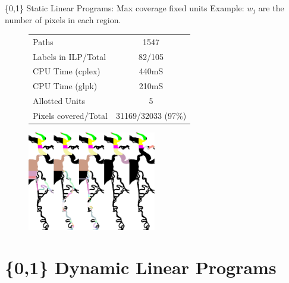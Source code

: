 \documentclass[xcolor=pdflatex,dvipsnames,table]{beamer}
\begin{document}
\begin{frame}{\{0,1\} Static Linear Programs: Max coverage fixed units}
Example: $w_j$ are the number of pixels in each region.
\begin{figure}
  \begin{tabular}{|l|c|}
  \hline 
  Paths & 1547 \\
  Labels in ILP/Total & 82/105 \\
  CPU Time (cplex) & 440mS\\
  CPU Time (glpk) & 210mS \\
  Allotted Units & 5\\
  Pixels covered/Total & 31169/32033 (97\%)\\
  \hline
  \end{tabular}
\end{figure}

  \begin{figure}
     {\includegraphics[width=0.5\textwidth]{figures/max_coverage_fixed_units_paths.png}}
  \end{figure}
\end{frame}


\section{\{0,1\} Dynamic Linear Programs}
\end{document}
